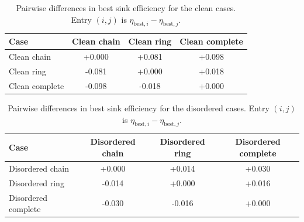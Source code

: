 \begin{table}[t]
\centering
\caption{Pairwise differences in best sink efficiency for the clean cases. Entry $(i,j)$ is $\eta_{\mathrm{best},i}-\eta_{\mathrm{best},j}$.}
\begin{tabular}{lccc}
\toprule
Case & Clean chain & Clean ring & Clean complete \\
\midrule
Clean chain & +0.000 & +0.081 & +0.098 \\
Clean ring & -0.081 & +0.000 & +0.018 \\
Clean complete & -0.098 & -0.018 & +0.000 \\
\bottomrule
\end{tabular}
\end{table}

\begin{table}[t]
\centering
\caption{Pairwise differences in best sink efficiency for the disordered cases. Entry $(i,j)$ is $\eta_{\mathrm{best},i}-\eta_{\mathrm{best},j}$.}
\begin{tabular}{lccc}
\toprule
Case & Disordered chain & Disordered ring & Disordered complete \\
\midrule
Disordered chain & +0.000 & +0.014 & +0.030 \\
Disordered ring & -0.014 & +0.000 & +0.016 \\
Disordered complete & -0.030 & -0.016 & +0.000 \\
\bottomrule
\end{tabular}
\end{table}
